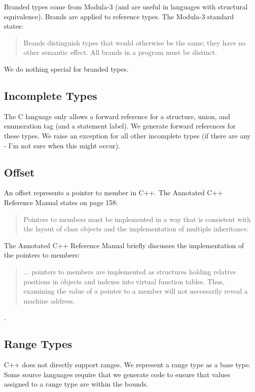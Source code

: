 Branded types come from Modula-3 (and are useful in languages with
structural equivalence).  Brands are applied to reference types. 
The Modula-3 standard states:
\begin{quote}
Brands distinguish types that would otherwise be the same; they have
no other semantic effect. All brands in a program must be distinct.
\end{quote}

We do nothing special for branded types.

\subsection{Incomplete Types}

The C language only allows a forward reference for a structure, union,
and enumeration tag (and a statement label).  We generate
forward references for these types.  We raise an exception
for all other incomplete types (if there are any - I'm not sure
when this might occur).

\subsection{Offset}

An offset represents a pointer to member in C++.  The Annotated
C++ Reference Manual states on page 158:
\begin{quote}
Pointers to members must be implemented in a way that is
consistent with the layout of class objects and the implementation
of multiple inheritance.
\end{quote}
The Annotated C++ Reference Manual briefly discusses the implementation
of the pointers to members:
\begin{quote}
... pointers to members are implemented as structures holding
relative positions in objects and indexes into virtual
function tables.  Thus, examining the value of a pointer to a member
will not necessarily reveal a machine address.
\end{quote}

.

\subsection{Range Types}

C++ does not directly support ranges.  We represent a range type
as a base type.  Some source languages require that we generate
code to ensure that values assigned to a range type are within the
bounds.

